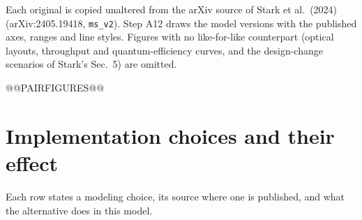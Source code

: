 \documentclass[11pt,a4paper]{article}
\begin{document}
Each original is copied unaltered from the arXiv source of Stark et al.\ (2024)
(arXiv:2405.19418, \texttt{ms\_v2}). Step A12 draws the model versions with the published axes,
ranges and line styles. Figures with no like-for-like counterpart (optical layouts, throughput and
quantum-efficiency curves, and the design-change scenarios of Stark's Sec.~5) are omitted.

@@PAIRFIGURES@@

\clearpage
\section{Implementation choices and their effect}
\label{app:choices}

Each row states a modeling choice, its source where one is published, and what the alternative
does in this model.
\end{document}
